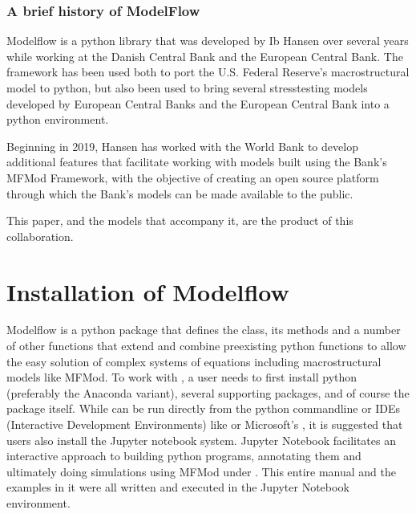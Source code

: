 \documentclass[letterpaper,10pt,english]{jupyterBook}
\begin{document}
\begin{sphinxShadowBox}
\sphinxstylesidebartitle{}
\subsubsection*{A brief history of ModelFlow}

\sphinxAtStartPar
Modelflow is a python library that was developed by Ib Hansen over several years while working at the Danish Central Bank and the European Central Bank. The framework has been used both to port the U.S. Federal Reserve’s macro\sphinxhyphen{}structural  model to python, but also been used to bring several stress\sphinxhyphen{}testing models developed by European Central Banks and the European Central Bank into a python environment.

\sphinxAtStartPar
Beginning in 2019, Hansen has worked with the World Bank to develop additional features that facilitate working with models built using the Bank’s MFMod Framework, with the objective of creating an open source platform through which the Bank’s models can be made available to the public.

\sphinxAtStartPar
This paper, and the models that accompany it, are the product of this collaboration.
\end{sphinxShadowBox}

\sphinxstepscope


\section{Installation of Modelflow}
\label{\detokenize{content/03_Installation/InstallingPython:installation-of-modelflow}}\label{\detokenize{content/03_Installation/InstallingPython::doc}}
\sphinxAtStartPar
Modelflow is a python package that defines the  class, its methods and a number of other functions that extend and combine pre\sphinxhyphen{}existing python functions to allow the easy solution of complex systems of equations including macro\sphinxhyphen{}structural models like MFMod.  To work with , a user needs to first install python (preferably the Anaconda variant), several supporting packages, and of course the  package itself.  While  can be run directly from the python command\sphinxhyphen{}line or IDEs (Interactive Development Environments) like  or Microsoft’s , it is suggested that users also install the Jupyter notebook system. Jupyter Notebook facilitates an interactive approach to building python programs, annotating them and ultimately doing simulations using MFMod under . This entire manual and the examples in it were all written and executed in the Jupyter Notebook environment.
\end{document}
